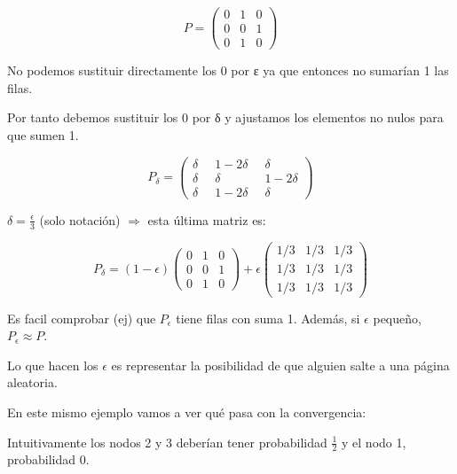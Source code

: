 \begin{example}

\begin{center}
\end{center}

	$$P = \left( \begin{array}{ccc}
0 & 1 & 0 \\
0 & 0 & 1 \\
0 & 1 & 0 \end{array} \right)$$

No podemos sustituir directamente los 0 por ε ya que entonces no sumarían 1 las filas.

Por tanto debemos sustituir los 0 por δ y ajustamos los elementos no nulos para que sumen 1.

$$P_{\delta} = \left( \begin{array}{ccc}
\delta & \;\; 1-2\delta \;\; & \delta \\
\delta & \;\; \delta \;\;& 1 - 2 \delta\\
\delta & \;\; 1 - 2 \delta \;\; & \delta \end{array} \right)$$



$\delta = \frac{\epsilon}{3}$ (solo notación) $\Rightarrow$ esta última matriz es:


$$P_{\delta}= (1-\epsilon)\left( \begin{array}{ccc}
0 & 1 & 0 \\
0 & 0 & 1 \\
0 & 1 & 0 \end{array} \right) + \epsilon \left( \begin{array}{ccc}
1/3 & 1/3 & 1/3 \\
1/3 & 1/3 & 1/3 \\
1/3 & 1/3 & 1/3 \end{array} \right)$$


Es facil comprobar (ej) que $P_{\epsilon}$ tiene filas con suma 1. Además, si $\epsilon$ pequeño, $P_{\epsilon} ≈ P$.

Lo que hacen los $\epsilon$ es representar la posibilidad de que alguien salte a una página aleatoria.

\begin{center}
\end{center}


En este mismo ejemplo vamos a ver qué pasa con la convergencia:

Intuitivamente los nodos 2 y 3 deberían tener probabilidad $\frac{1}{2}$ y el nodo 1, probabilidad 0.


\end{example}
